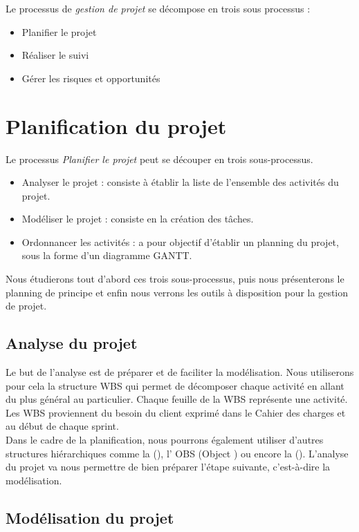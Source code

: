 Le processus de \textit{gestion de projet} se décompose en trois sous processus : 
\begin{itemize}
\item Planifier le projet
\item Réaliser le suivi
\item Gérer les risques et opportunités
\end{itemize}

\section{Planification du projet}
\label{planification}

Le processus \textit{Planifier le projet} peut se découper en trois sous-processus.

\begin{itemize}
\item Analyser le projet : consiste à établir la liste de l'ensemble des activités du projet.
\item Modéliser le projet : consiste en la création des tâches.
\item Ordonnancer les activités : a pour objectif d'établir un planning du projet, sous la forme d'un diagramme GANTT.
\end{itemize}

Nous étudierons tout d'abord ces trois sous-processus, puis nous présenterons le planning de principe et enfin nous verrons les outils à disposition pour la gestion de projet. 

\subsection{Analyse du projet}
\label{analyse}
Le but de l'analyse est de préparer et de faciliter la modélisation. Nous utiliserons pour cela la structure WBS qui permet de décomposer chaque activité en allant du plus général au particulier. Chaque feuille de la WBS représente une activité. Les WBS proviennent du besoin du client exprimé dans le Cahier des charges et au début de chaque sprint. \\

Dans le cadre de la planification, nous pourrons également utiliser d’autres structures hiérarchiques comme la \FBSCourt (\FBS), l’ OBS (Object \BS) ou encore la \RBSCourt (\RBS). L’analyse du projet va nous permettre de bien préparer l’étape suivante, c’est-à-dire la modélisation.


\subsection{Modélisation du projet}
\label{modelisation}

